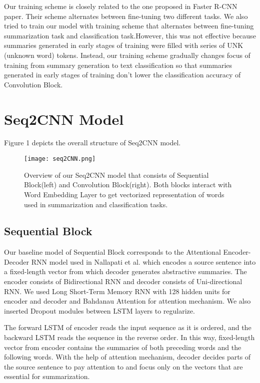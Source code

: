 \documentclass{article}
\begin{document}
Our training scheme is closely related to the one proposed in Faster R-CNN paper\cite{DBLP:journals/corr/RenHG015}. Their scheme alternates between fine-tuning two different tasks. We also tried to train our model with training scheme that alternates between fine-tuning summarization task and classification task.However, this was not effective because summaries generated in early stages of training were filled with series of UNK (unknown word) tokens. Instead, our training scheme gradually changes focus of training from summary generation to text classification so that summaries generated in early stages of training don’t lower the classification accuracy of Convolution Block.


\section{Seq2CNN Model}
Figure 1 depicts the overall structure of Seq2CNN model.
\begin{figure}[!ht]
  \centering
  \texttt{[image: seq2CNN.png]}
  \caption{Overview of our Seq2CNN model that consists of Sequential Block(left) and Convolution Block(right). Both blocks interact with Word Embedding Layer to get vectorized representation of words used in summarization and classification tasks.}
\end{figure}

\subsection{Sequential Block}
Our baseline model of Sequential Block corresponds to the Attentional Encoder-Decoder RNN model used in Nallapati et al.\cite{DBLP:journals/corr/NallapatiXZ16} which encodes a source sentence into a fixed-length vector from which decoder generates abstractive summaries. The encoder consists of Bidirectional RNN\cite{650093} and decoder consists of Uni-directional RNN\cite{6638947}. We used Long Short-Term Memory RNN\cite{Hochreiter:1997:LSM:265493.264179} with 128 hidden units for encoder and decoder and Bahdanau Attention\cite{DBLP:journals/corr/BahdanauCB14} for attention mechanism. We also inserted Dropout\cite{JMLR:v15:srivastava14a} modules between LSTM layers to regularize.

The forward LSTM of encoder reads the input sequence as it is ordered, and the backward LSTM reads the sequence in the reverse order. In this way, fixed-length vector from encoder contains the summaries of both preceding words and the following words. With the help of attention mechanism, decoder decides parts of the source sentence to pay attention to and focus only on the vectors that are essential for summarization. 
\end{document}
